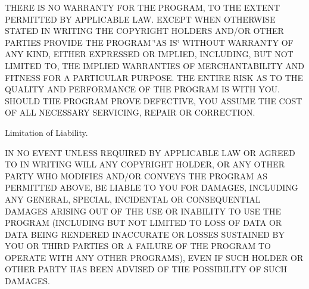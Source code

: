 T\+H\+E\+R\+E I\+S N\+O W\+A\+R\+R\+A\+N\+T\+Y F\+O\+R T\+H\+E P\+R\+O\+G\+R\+A\+M, T\+O T\+H\+E E\+X\+T\+E\+N\+T P\+E\+R\+M\+I\+T\+T\+E\+D B\+Y A\+P\+P\+L\+I\+C\+A\+B\+L\+E L\+A\+W. E\+X\+C\+E\+P\+T W\+H\+E\+N O\+T\+H\+E\+R\+W\+I\+S\+E S\+T\+A\+T\+E\+D I\+N W\+R\+I\+T\+I\+N\+G T\+H\+E C\+O\+P\+Y\+R\+I\+G\+H\+T H\+O\+L\+D\+E\+R\+S A\+N\+D/\+O\+R O\+T\+H\+E\+R P\+A\+R\+T\+I\+E\+S P\+R\+O\+V\+I\+D\+E T\+H\+E P\+R\+O\+G\+R\+A\+M \char`\"{}\+A\+S I\+S\char`\"{} W\+I\+T\+H\+O\+U\+T W\+A\+R\+R\+A\+N\+T\+Y O\+F A\+N\+Y K\+I\+N\+D, E\+I\+T\+H\+E\+R E\+X\+P\+R\+E\+S\+S\+E\+D O\+R I\+M\+P\+L\+I\+E\+D, I\+N\+C\+L\+U\+D\+I\+N\+G, B\+U\+T N\+O\+T L\+I\+M\+I\+T\+E\+D T\+O, T\+H\+E I\+M\+P\+L\+I\+E\+D W\+A\+R\+R\+A\+N\+T\+I\+E\+S O\+F M\+E\+R\+C\+H\+A\+N\+T\+A\+B\+I\+L\+I\+T\+Y A\+N\+D F\+I\+T\+N\+E\+S\+S F\+O\+R A P\+A\+R\+T\+I\+C\+U\+L\+A\+R P\+U\+R\+P\+O\+S\+E. T\+H\+E E\+N\+T\+I\+R\+E R\+I\+S\+K A\+S T\+O T\+H\+E Q\+U\+A\+L\+I\+T\+Y A\+N\+D P\+E\+R\+F\+O\+R\+M\+A\+N\+C\+E O\+F T\+H\+E P\+R\+O\+G\+R\+A\+M I\+S W\+I\+T\+H Y\+O\+U. S\+H\+O\+U\+L\+D T\+H\+E P\+R\+O\+G\+R\+A\+M P\+R\+O\+V\+E D\+E\+F\+E\+C\+T\+I\+V\+E, Y\+O\+U A\+S\+S\+U\+M\+E T\+H\+E C\+O\+S\+T O\+F A\+L\+L N\+E\+C\+E\+S\+S\+A\+R\+Y S\+E\+R\+V\+I\+C\+I\+N\+G, R\+E\+P\+A\+I\+R O\+R C\+O\+R\+R\+E\+C\+T\+I\+O\+N.


\begin{DoxyEnumerate}
\item Limitation of Liability.
\end{DoxyEnumerate}

I\+N N\+O E\+V\+E\+N\+T U\+N\+L\+E\+S\+S R\+E\+Q\+U\+I\+R\+E\+D B\+Y A\+P\+P\+L\+I\+C\+A\+B\+L\+E L\+A\+W O\+R A\+G\+R\+E\+E\+D T\+O I\+N W\+R\+I\+T\+I\+N\+G W\+I\+L\+L A\+N\+Y C\+O\+P\+Y\+R\+I\+G\+H\+T H\+O\+L\+D\+E\+R, O\+R A\+N\+Y O\+T\+H\+E\+R P\+A\+R\+T\+Y W\+H\+O M\+O\+D\+I\+F\+I\+E\+S A\+N\+D/\+O\+R C\+O\+N\+V\+E\+Y\+S T\+H\+E P\+R\+O\+G\+R\+A\+M A\+S P\+E\+R\+M\+I\+T\+T\+E\+D A\+B\+O\+V\+E, B\+E L\+I\+A\+B\+L\+E T\+O Y\+O\+U F\+O\+R D\+A\+M\+A\+G\+E\+S, I\+N\+C\+L\+U\+D\+I\+N\+G A\+N\+Y G\+E\+N\+E\+R\+A\+L, S\+P\+E\+C\+I\+A\+L, I\+N\+C\+I\+D\+E\+N\+T\+A\+L O\+R C\+O\+N\+S\+E\+Q\+U\+E\+N\+T\+I\+A\+L D\+A\+M\+A\+G\+E\+S A\+R\+I\+S\+I\+N\+G O\+U\+T O\+F T\+H\+E U\+S\+E O\+R I\+N\+A\+B\+I\+L\+I\+T\+Y T\+O U\+S\+E T\+H\+E P\+R\+O\+G\+R\+A\+M (I\+N\+C\+L\+U\+D\+I\+N\+G B\+U\+T N\+O\+T L\+I\+M\+I\+T\+E\+D T\+O L\+O\+S\+S O\+F D\+A\+T\+A O\+R D\+A\+T\+A B\+E\+I\+N\+G R\+E\+N\+D\+E\+R\+E\+D I\+N\+A\+C\+C\+U\+R\+A\+T\+E O\+R L\+O\+S\+S\+E\+S S\+U\+S\+T\+A\+I\+N\+E\+D B\+Y Y\+O\+U O\+R T\+H\+I\+R\+D P\+A\+R\+T\+I\+E\+S O\+R A F\+A\+I\+L\+U\+R\+E O\+F T\+H\+E P\+R\+O\+G\+R\+A\+M T\+O O\+P\+E\+R\+A\+T\+E W\+I\+T\+H A\+N\+Y O\+T\+H\+E\+R P\+R\+O\+G\+R\+A\+M\+S), E\+V\+E\+N I\+F S\+U\+C\+H H\+O\+L\+D\+E\+R O\+R O\+T\+H\+E\+R P\+A\+R\+T\+Y H\+A\+S B\+E\+E\+N A\+D\+V\+I\+S\+E\+D O\+F T\+H\+E P\+O\+S\+S\+I\+B\+I\+L\+I\+T\+Y O\+F S\+U\+C\+H D\+A\+M\+A\+G\+E\+S.


